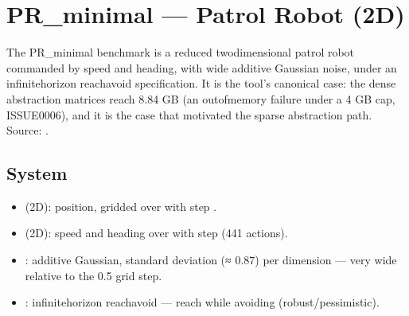 \documentclass[a4paper,10pt,english]{sphinxmanual}
\begin{document}
\section{PR\_minimal — Patrol Robot (2D)}
\label{\detokenize{benchmarks/PR_minimal:pr-minimal-patrol-robot-2d}}\label{\detokenize{benchmarks/PR_minimal::doc}}
\sphinxAtStartPar
The PR\_minimal benchmark is a reduced two\sphinxhyphen{}dimensional patrol robot commanded by speed
and heading, with wide additive Gaussian noise, under an infinite\sphinxhyphen{}horizon reach\sphinxhyphen{}avoid
specification. It is the tool’s canonical  case: the dense abstraction
matrices reach 8.84 GB (an out\sphinxhyphen{}of\sphinxhyphen{}memory failure under a 4 GB cap, ISSUE\sphinxhyphen{}0006), and it
is the case that motivated the sparse abstraction path. Source:
.


\subsection{System}
\label{\detokenize{benchmarks/PR_minimal:system}}\begin{itemize}
\item {} 
\sphinxAtStartPar
{} (2D): position, gridded over  with step .

\item {} 
\sphinxAtStartPar
{} (2D): speed and heading over  with step 
(441 actions).

\item {} 
\sphinxAtStartPar
{}: additive Gaussian, standard deviation  (≈ 0.87) per
dimension — very wide relative to the 0.5 grid step.

\item {} 
\sphinxAtStartPar
{}: infinite\sphinxhyphen{}horizon reach\sphinxhyphen{}avoid — reach  while
avoiding  (robust/pessimistic).

\end{itemize}
\end{document}

